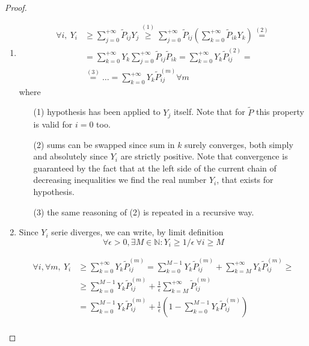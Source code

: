 \begin{proof}
\begin{enumerate}
		\item \begin{equation}\begin{split}
			\forall i, ~ Y_i & \ge \sum_{j=0}^{+\infty} \tilde{P}_{ij} Y_j \stackrel{(1)}{\ge}
			\sum_{j=0}^{+\infty} \tilde{P}_{ij} \left( \sum_{k=0}^{+\infty} \tilde{P}_{ik} Y_k \right) \stackrel{(2)}{=} \\
			& = \sum_{k=0}^{+\infty} Y_k \sum_{j=0}^{+\infty} \tilde{P}_{ij}  \tilde{P}_{ik} =
			\sum_{k=0}^{+\infty} Y_k \tilde{P}_{ij}^{(2)} = \\
			& \stackrel{(3)}{=} \ldots = \sum_{k=0}^{+\infty} Y_k \tilde{P}_{ij}^{(m)} \forall m
		\end{split}\end{equation}
		where
		\begin{itemize}
			\item [(1)] hypothesis has been applied to $Y_j$ itself. Note that for $\tilde{P}$ this property is valid for $i=0$ too.
			\item [(2)] sums can be swapped since sum in $k$ surely converges, both simply and absolutely since $Y_i$ are strictly positive. Note that convergence is guaranteed by the fact that at the left side of the current chain of decreasing inequalities we find the real number $Y_i$, that exists for hypothesis.
			\item [(3)] the same reasoning of (2) is repeated in a recursive way.
		\end{itemize}

		\item
		Since $Y_i$ serie diverges, we can write, by limit definition
		$$ \forall \epsilon > 0, \exists M \in \mathbb{N} : Y_i \ge 1 / \epsilon ~ \forall i \ge M$$

		\begin{equation}\begin{split}
			\forall i, \forall m, ~ Y_i & \ge \sum_{k=0}^{+\infty} Y_k \tilde{P}_{ij}^{(m)}
				= \sum_{k=0}^{M-1} Y_k \tilde{P}_{ij}^{(m)}
				+ \sum_{k=M}^{+\infty} Y_k \tilde{P}_{ij}^{(m)} \ge \\
			& \ge \sum_{k=0}^{M-1} Y_k \tilde{P}_{ij}^{(m)}
				+ \frac{1}{\epsilon} \sum_{k=M}^{+\infty} \tilde{P}_{ij}^{(m)} \\
			& = \sum_{k=0}^{M-1} Y_k \tilde{P}_{ij}^{(m)}
				+ \frac{1}{\epsilon} \left( 1 - \sum_{k=0}^{M-1} Y_k \tilde{P}_{ij}^{(m)} \right) \\
		\end{split}\end{equation}


\end{enumerate}
\end{proof}
